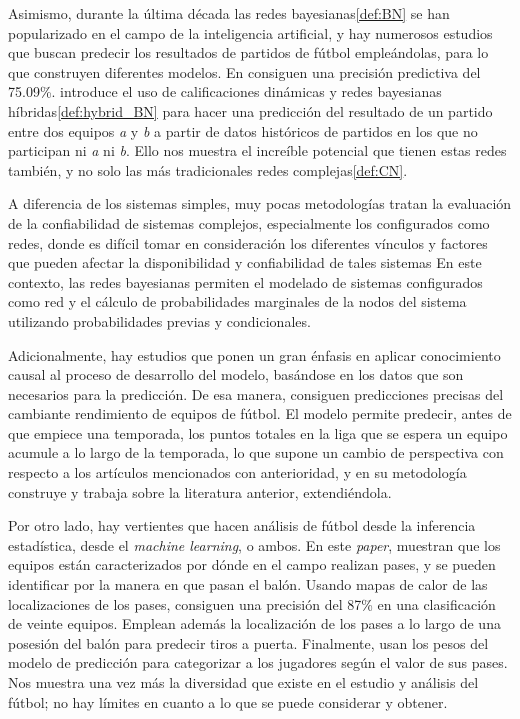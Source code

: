 Asimismo, durante la última década las redes bayesianas\ref{def:BN} se han popularizado en el campo 
de la inteligencia artificial, y hay numerosos estudios que buscan predecir los resultados 
de partidos de fútbol empleándolas, para lo que construyen diferentes modelos\cite{prediction-barcelona}.
En \cite{razali-2017} consiguen una precisión predictiva del 75.09\%. \cite{dolores} introduce el uso 
de calificaciones dinámicas\cite{pi-ratings} y redes bayesianas híbridas\ref{def:hybrid_BN} para hacer una predicción del resultado de un 
partido entre dos equipos \textit{a} y \textit{b} a partir de datos históricos de partidos 
en los que no participan ni \textit{a} ni \textit{b}. Ello nos muestra 
el increíble potencial que tienen estas redes también, y no solo las más tradicionales 
redes complejas\ref{def:CN}. 

A diferencia de los sistemas simples, muy pocas metodologías tratan la evaluación de la confiabilidad de
sistemas complejos, especialmente los configurados como redes, donde es difícil tomar en
consideración los diferentes vínculos y factores que pueden afectar la disponibilidad y confiabilidad de tales
sistemas En este contexto, las redes bayesianas permiten el
modelado de sistemas configurados como red y el cálculo de probabilidades marginales de la
nodos del sistema utilizando probabilidades previas y condicionales.\cite{bn-and-cn}

Adicionalmente, hay estudios\cite{smart-data} que ponen un gran énfasis 
en aplicar conocimiento causal al proceso de desarrollo del modelo, basándose 
en los datos que son necesarios para la predicción. De esa manera, consiguen predicciones precisas 
del cambiante rendimiento de equipos de fútbol. El modelo permite predecir, antes de que empiece 
una temporada, los puntos totales en la liga que se espera un equipo acumule a lo largo de la temporada, lo 
que supone un cambio de perspectiva con respecto a los artículos mencionados con anterioridad, y en su 
metodología construye y trabaja sobre la literatura anterior, extendiéndola.

Por otro lado, hay vertientes que hacen análisis de fútbol desde la inferencia estadística, desde 
el \textit{machine learning}, o ambos\cite{ML-inference}. En este \textit{paper}, muestran que 
los equipos están caracterizados por dónde en el campo realizan pases, y se 
pueden identificar por la manera en que pasan el balón. Usando mapas de calor de las localizaciones 
de los pases, consiguen una precisión del 87\% en una clasificación de veinte equipos. Emplean 
además la localización de los pases a lo largo de una posesión del balón para predecir tiros a 
puerta. Finalmente, usan los pesos del modelo de predicción para categorizar a los jugadores 
según el valor de sus pases. Nos muestra una vez más la diversidad que existe en el estudio 
y análisis del fútbol; no hay límites en cuanto a lo que se puede considerar y obtener.

